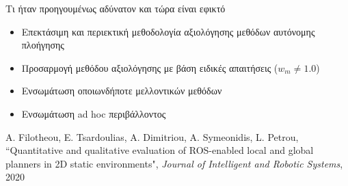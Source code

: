 \begin{frame}{Τι ήταν προηγουμένως αδύνατον και τώρα είναι εφικτό}

  \begin{itemize}
    \item Επεκτάσιμη και περιεκτική μεθοδολογία αξιολόγησης μεθόδων αυτόνομης πλοήγησης
    \item Προσαρμογή μεθόδου αξιολόγησης με βάση ειδικές απαιτήσεις ($w_m \neq 1.0$)
    \item Ενσωμάτωση οποιωνδήποτε μελλοντικών μεθόδων
    \item Ενσωμάτωση ad hoc περιβάλλοντος
  \end{itemize}

\placebottom
  \tiny A. Filotheou, E. Tsardoulias, A. Dimitriou, A. Symeonidis, L. Petrou, ``Quantitative and qualitative evaluation of ROS-enabled local and global planners in 2D static environments",  \textit{Journal of Intelligent and Robotic Systems}, 2020
\end{frame}
